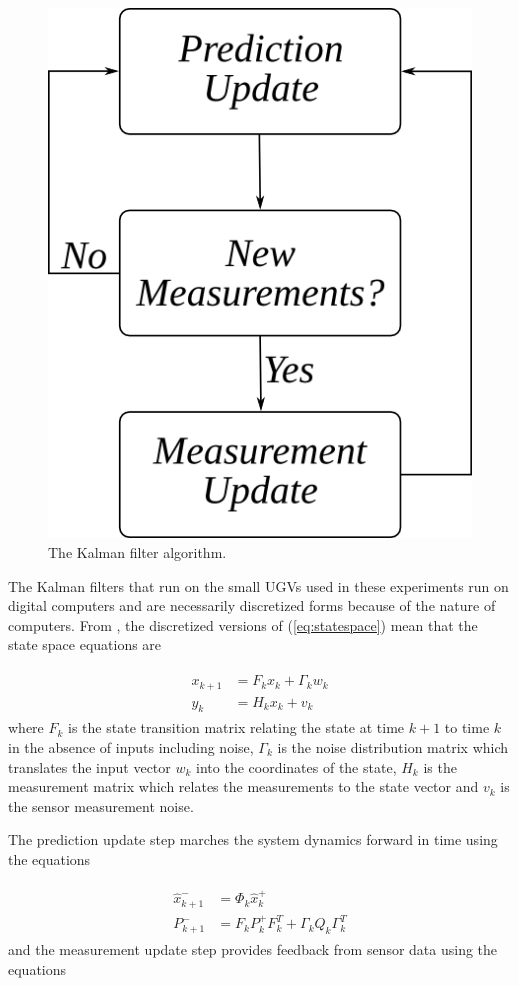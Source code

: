 \begin{figure}[ht!]
	\centering
	\includegraphics[width=.4\textwidth]{images/kf}
	\caption{The Kalman filter algorithm.}
	\label{fig:kf}
\end{figure}

The Kalman filters that run on the small UGVs used in these experiments run on digital computers and are necessarily discretized forms because of the nature of computers. From \cite{Kelly_1994_338}, \cite{Simon06OptimalEstimation} the discretized versions of (\ref{eq:statespace}) mean that the state space equations are

\begin{align}
\label{eq:kfstatemodel}
\begin{split}
x_{k+1} &= F_kx_k + \Gamma_kw_k \\
y_k &= H_kx_k + v_k
\end{split}
\end{align}
where $F_k$ is the state transition matrix relating the state at time $k+1$ to time $k$ in the absence of inputs including noise, $\Gamma_k$ is the noise distribution matrix which translates the input vector $w_k$ into the coordinates of the state, $H_k$ is the measurement matrix which relates the measurements to the state vector and $v_k$ is the sensor measurement noise.

The prediction update step marches the system dynamics forward in time using the equations

\begin{align}
\label{eq:kfpredictionupdate}
\begin{split}
\hat{x}_{k+1}^- &= \Phi_k\hat{x}_k^+ \\
P_{k+1}^- &= F_kP_k^+F_k^T + \Gamma_kQ_k\Gamma_k^T
\end{split}
\end{align}
and the measurement update step provides feedback from sensor data using the equations

